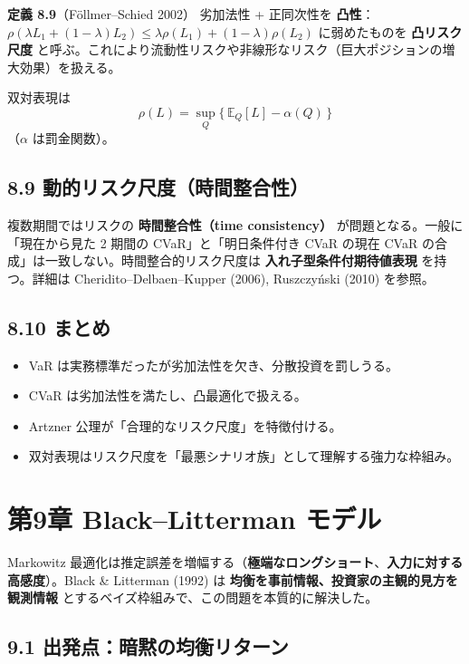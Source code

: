 \documentclass[11pt,a4paper]{report}
\begin{document}
\textbf{定義 8.9}（Föllmer–Schied 2002） 劣加法性 + 正同次性を \textbf{凸性}：$\rho(\lambda L_1 + (1-\lambda) L_2) \le \lambda\rho(L_1) + (1-\lambda)\rho(L_2)$ に弱めたものを \textbf{凸リスク尺度} と呼ぶ。これにより流動性リスクや非線形なリスク（巨大ポジションの増大効果）を扱える。

双対表現は \[ \rho(L) = \sup_{Q} \{\, \mathbb{E}_Q[L] - \alpha(Q) \,\} \] （$\alpha$ は罰金関数）。

\section{8.9 動的リスク尺度（時間整合性）}

複数期間ではリスクの \textbf{時間整合性（time consistency）} が問題となる。一般に「現在から見た 2 期間の CVaR」と「明日条件付き CVaR の現在 CVaR の合成」は一致しない。時間整合的リスク尺度は \textbf{入れ子型条件付期待値表現} を持つ。詳細は Cheridito–Delbaen–Kupper (2006), Ruszczyński (2010) を参照。

\section{8.10 まとめ}

\begin{itemize}
\item VaR は実務標準だったが劣加法性を欠き、分散投資を罰しうる。
\item CVaR は劣加法性を満たし、凸最適化で扱える。
\item Artzner 公理が「合理的なリスク尺度」を特徴付ける。
\item 双対表現はリスク尺度を「最悪シナリオ族」として理解する強力な枠組み。
\end{itemize}

\noindent\hrulefill

\chapter{第9章 Black–Litterman モデル}

Markowitz 最適化は推定誤差を増幅する（\textbf{極端なロングショート}、\textbf{入力に対する高感度}）。Black \& Litterman (1992) は \textbf{均衡を事前情報、投資家の主観的見方を観測情報} とするベイズ枠組みで、この問題を本質的に解決した。

\section{9.1 出発点：暗黙の均衡リターン}
\end{document}
